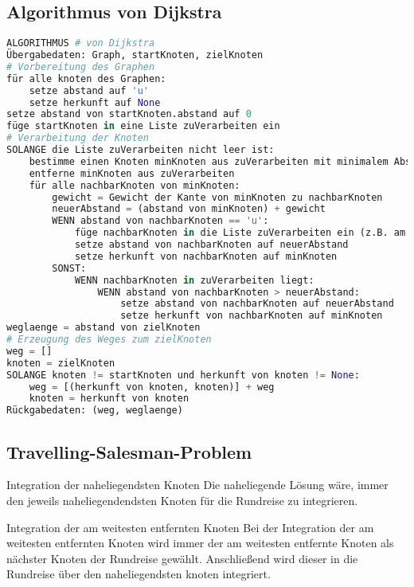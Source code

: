 \subsection{Algorithmus von Dijkstra}
\begin{lstlisting}[language=Python]
ALGORITHMUS # von Dijkstra
Übergabedaten: Graph, startKnoten, zielKnoten
# Vorbereitung des Graphen
für alle knoten des Graphen:
    setze abstand auf 'u'
    setze herkunft auf None
setze abstand von startKnoten.abstand auf 0
füge startKnoten in eine Liste zuVerarbeiten ein
# Verarbeitung der Knoten
SOLANGE die Liste zuVerarbeiten nicht leer ist:
    bestimme einen Knoten minKnoten aus zuVerarbeiten mit minimalem Abstand
    entferne minKnoten aus zuVerarbeiten
    für alle nachbarKnoten von minKnoten:
        gewicht = Gewicht der Kante von minKnoten zu nachbarKnoten
        neuerAbstand = (abstand von minKnoten) + gewicht
        WENN abstand von nachbarKnoten == 'u':
            füge nachbarKnoten in die Liste zuVerarbeiten ein (z.B. am Listenende)
            setze abstand von nachbarKnoten auf neuerAbstand
            setze herkunft von nachbarKnoten auf minKnoten
        SONST:
            WENN nachbarKnoten in zuVerarbeiten liegt:
                WENN abstand von nachbarKnoten > neuerAbstand:
                    setze abstand von nachbarKnoten auf neuerAbstand
                    setze herkunft von nachbarKnoten auf minKnoten
weglaenge = abstand von zielKnoten
# Erzeugung des Weges zum zielKnoten
weg = []
knoten = zielKnoten
SOLANGE knoten != startKnoten und herkunft von knoten != None:
    weg = [(herkunft von knoten, knoten)] + weg
    knoten = herkunft von knoten
Rückgabedaten: (weg, weglaenge)
\end{lstlisting}

\subsection{Travelling-Salesman-Problem}
\begin{zitat}{Integration der naheliegendsten Knoten}
Die naheliegende Lösung wäre, immer den jeweils naheliegendendsten Knoten für die Rundreise zu integrieren.
\end{zitat}

\begin{zitat}{Integration der am weitesten entfernten Knoten}
Bei der Integration der am weitesten entfernten Knoten wird immer der am weitesten entfernte Knoten als nächster Knoten der Rundreise gewählt. Anschließend wird dieser in die Rundreise über den naheliegendsten knoten integriert.
\end{zitat}
\newpage
